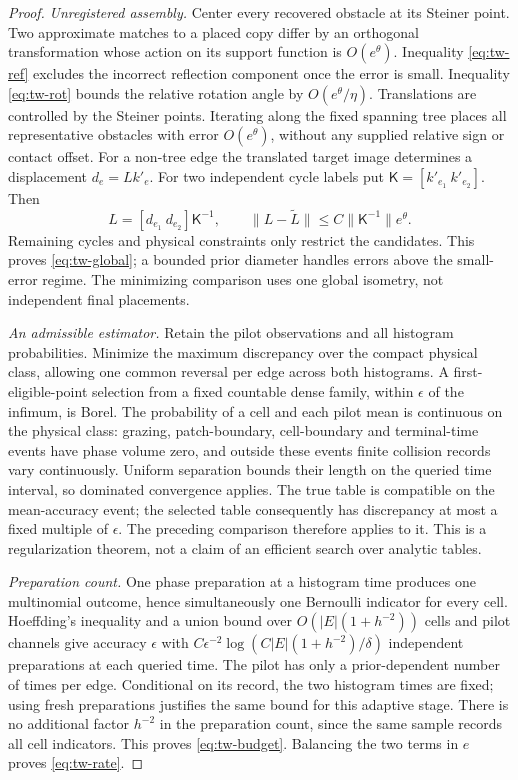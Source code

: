 \begin{proof}
\emph{Unregistered assembly.}
Center every recovered obstacle at its Steiner point. Two approximate
matches to a placed copy differ by an orthogonal transformation whose
action on its support function is $O(e^\theta)$. Inequality
\eqref{eq:tw-ref} excludes the incorrect reflection component once
the error is small. Inequality \eqref{eq:tw-rot} bounds the relative
rotation angle by $O(e^\theta/\eta)$. Translations are controlled
by the Steiner points. Iterating along the fixed spanning tree places
all representative obstacles with error $O(e^\theta)$, without any
supplied relative sign or contact offset. For a non-tree edge the
translated target image determines a displacement $d_e=Lk'_e$.
For two independent cycle labels put
$\mathsf K=[k'_{e_1}\ k'_{e_2}]$. Then
\[
 L=[d_{e_1}\ d_{e_2}]\mathsf K^{-1},\qquad
 \|L-\widetilde L\|\le C\|\mathsf K^{-1}\|e^\theta.
\]
Remaining cycles and physical constraints only restrict the candidates.
This proves \eqref{eq:tw-global}; a bounded prior diameter handles
errors above the small-error regime. The minimizing comparison uses
one global isometry, not independent final placements.

\emph{An admissible estimator.}
Retain the pilot observations and all histogram probabilities. Minimize
the maximum discrepancy over the compact physical class, allowing one
common reversal per edge across both histograms. A first-eligible-point
selection from a fixed countable dense family, within $\epsilon$
of the infimum, is Borel. The probability of a cell and each pilot
mean is continuous on the physical class: grazing, patch-boundary,
cell-boundary and terminal-time events have phase volume zero, and
outside these events finite collision records vary continuously.
Uniform separation bounds their length on the queried time interval,
so dominated convergence applies. The true table is compatible on the
mean-accuracy event; the selected table consequently has discrepancy
at most a fixed multiple of $\epsilon$. The preceding comparison
therefore applies to it. This is a regularization theorem, not a claim
of an efficient search over analytic tables.

\emph{Preparation count.}
One phase preparation at a histogram time produces one multinomial
outcome, hence simultaneously one Bernoulli indicator for every cell.
Hoeffding's inequality and a union bound over
$O(|E|(1+h^{-2}))$ cells and pilot channels give accuracy $\epsilon$
with $C\epsilon^{-2}\log(C|E|(1+h^{-2})/\delta)$ independent
preparations at each queried time. The pilot has only a prior-dependent
number of times per edge. Conditional on its record, the two histogram
times are fixed; using fresh preparations justifies the same bound for
this adaptive stage. There is no additional factor $h^{-2}$ in the
preparation count, since the same sample records all cell indicators.
This proves \eqref{eq:tw-budget}. Balancing the two terms in $e$
proves \eqref{eq:tw-rate}.
\end{proof}

